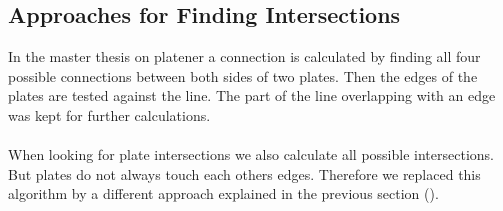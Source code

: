 \documentclass[../ClassicThesis.tex]{subfiles}
\begin{document}
\subsection{Approaches for Finding Intersections}
In the master thesis on platener\cite{master-thesis} a connection is calculated by finding all four possible connections between both sides of two plates. Then the edges of the plates are tested against the line. The part of the line overlapping with an edge was kept for further calculations.\\
\*\\
When looking for plate intersections we also calculate all possible intersections. But plates do not always touch each others edges. Therefore we replaced this algorithm by a different approach explained in the previous section ().
\end{document}
